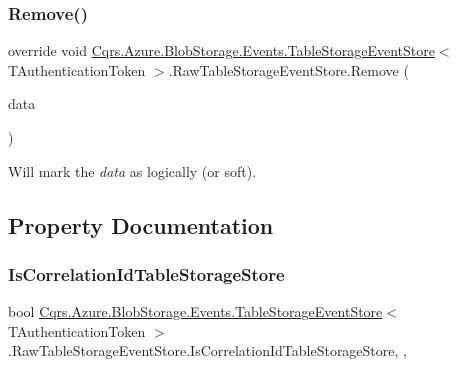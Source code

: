 \subsubsection{\texorpdfstring{Remove()}{Remove()}}
{\footnotesize\ttfamily override void \hyperlink{classCqrs_1_1Azure_1_1BlobStorage_1_1Events_1_1TableStorageEventStore}{Cqrs.\+Azure.\+Blob\+Storage.\+Events.\+Table\+Storage\+Event\+Store}$<$ T\+Authentication\+Token $>$.Raw\+Table\+Storage\+Event\+Store.\+Remove (\begin{DoxyParamCaption}\item[{\hyperlink{classCqrs_1_1Events_1_1EventData}{Event\+Data}}]{data }\end{DoxyParamCaption})}



Will mark the {\itshape data}  as logically (or soft). 



\subsection{Property Documentation}
\mbox{\label{classCqrs_1_1Azure_1_1BlobStorage_1_1Events_1_1TableStorageEventStore_1_1RawTableStorageEventStore_a566f4821980b2ca77f12f88d010beff2_a566f4821980b2ca77f12f88d010beff2}} 
\subsubsection{\texorpdfstring{Is\+Correlation\+Id\+Table\+Storage\+Store}{IsCorrelationIdTableStorageStore}}
{\footnotesize\ttfamily bool \hyperlink{classCqrs_1_1Azure_1_1BlobStorage_1_1Events_1_1TableStorageEventStore}{Cqrs.\+Azure.\+Blob\+Storage.\+Events.\+Table\+Storage\+Event\+Store}$<$ T\+Authentication\+Token $>$.Raw\+Table\+Storage\+Event\+Store.\+Is\+Correlation\+Id\+Table\+Storage\+Store\hspace{0.3cm}{\ttfamily [get]}, {\ttfamily [set]}, {\ttfamily [protected]}}

